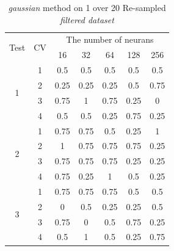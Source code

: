 \documentclass[draft,dvipsnames]{drexel-thesis}
\begin{document}
\begin{thesis}
\begin{table}[!t]
\centering
\caption{{\em gaussian} method on 1 over 20 Re-sampled {\em filtered dataset}}
\label{tbl:gaussian_1_20}
\begin{tabular}{|c|c|c|c|c|c|c|}
\hline
\multirow{2}{*}{Test} & \multirow{2}{*}{CV} & \multicolumn{5}{c|}{The number of neurans}                               \\ \cline{3-7} 
                      &                     & 16           & 32           & 64           & 128          & 256          \\ \hline
\multirow{4}{*}{1}    & 1                   & 0.5          & 0.5          & 0.5          & 0.5          & 0.5          \\ \cline{2-7} 
                      & 2                   & 0.25         & 0.25         & 0.25         & 0.5          & 0.75         \\ \cline{2-7} 
                      & 3                   & 0.75         & 1            & 0.75         & 0.25         & 0            \\ \cline{2-7} 
                      & 4                   & 0.5          & 0.5          & 0.25         & 0.75         & 0.25         \\ \hline
\multirow{4}{*}{2}    & 1                   & 0.75         & 0.75         & 0.5          & 0.25         & 1            \\ \cline{2-7} 
                      & 2                   & 1            & 0.75         & 0.75         & 0.75         & 0.25         \\ \cline{2-7} 
                      & 3                   & 0.75         & 0.75         & 0.75         & 0.25         & 0.25         \\ \cline{2-7} 
                      & 4                   & 0.75         & 0.25         & 1            & 0.5          & 0.25         \\ \hline
\multirow{4}{*}{3}    & 1                   & 0.75         & 0.75         & 0.75         & 0.5          & 0.5          \\ \cline{2-7} 
                      & 2                   & 0            & 0.5          & 0.25         & 0.25         & 0.5          \\ \cline{2-7} 
                      & 3                   & 0.75         & 0            & 0.5          & 0.75         & 0.25         \\ \cline{2-7} 
                      & 4                   & 0.5          & 1            & 0.5          & 0.25         & 0.75         \\ \hline

\end{tabular}
\end{table}
\end{thesis}
\end{document}
